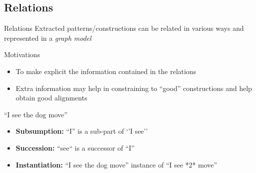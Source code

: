 \documentclass[compress]{beamer}
\begin{document}
%		
%

\subsection{Relations}

\begin{frame}
	\begin{block}{Relations}
		Extracted patterns/constructions can be related in various ways and represented in a \emph{graph model}
	\end{block}


	\begin{block}{Motivations}
		\begin{itemize}
			\item To make explicit the information contained in the relations
			\item Extra information may help in constraining to ``good'' constructions and help obtain good alignments
		\end{itemize}
	\end{block}

	\begin{example}
		``I see the dog move''
		\begin{itemize}
			\item \textbf{Subsumption:}   ``I'' is a sub-part of `'I see''
			\item \textbf{Succession:}	  ``see`` is a successor of ``I''
			\item \textbf{Instantiation:}   ``I see the dog move'' instance of ``I see *2* move''
		\end{itemize}
	\end{example}		
\end{frame}
\end{document}
